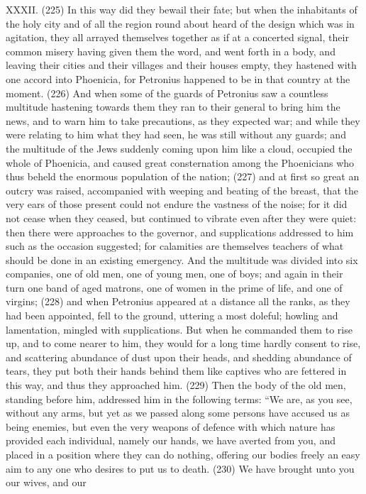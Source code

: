 XXXII. (225) In this way did they bewail their fate; but when the inhabitants of the holy city and of all
the region round about heard of the design which was in agitation, they all arrayed themselves
together as if at a concerted signal, their common misery having given them the word, and went
forth in a body, and leaving their cities and their villages and their houses empty, they hastened
with one accord into Phoenicia, for Petronius happened to be in that country at the moment. (226)
And when some of the guards of Petronius saw a countless multitude hastening towards them they
ran to their general to bring him the news, and to warn him to take precautions, as they expected
war; and while they were relating to him what they had seen, he was still without any guards; and
the multitude of the Jews suddenly coming upon him like a cloud, occupied the whole of Phoenicia,
and caused great consternation among the Phoenicians who thus beheld the enormous population
of the nation; (227) and at first so great an outcry was raised, accompanied with weeping and
beating of the breast, that the very ears of those present could not endure the vastness of the
noise; for it did not cease when they ceased, but continued to vibrate even after they were quiet:
then there were approaches to the governor, and supplications addressed to him such as the
occasion suggested; for calamities are themselves teachers of what should be done in an existing
emergency. And the multitude was divided into six companies, one of old men, one of young men,
one of boys; and again in their turn one band of aged matrons, one of women in the prime of life,
and one of virgins; (228) and when Petronius appeared at a distance all the ranks, as they had
been appointed, fell to the ground, uttering a most doleful; howling and lamentation, mingled with
supplications. But when he commanded them to rise up, and to come nearer to him, they would for
a long time hardly consent to rise, and scattering abundance of dust upon their heads, and
shedding abundance of tears, they put both their hands behind them like captives who are fettered
in this way, and thus they approached him. (229) Then the body of the old men, standing before
him, addressed him in the following terms: ``We are, as you see, without any arms, but yet as we
passed along some persons have accused us as being enemies, but even the very weapons of
defence with which nature has provided each individual, namely our hands, we have averted from
you, and placed in a position where they can do nothing, offering our bodies freely an easy aim to
any one who desires to put us to death. (230) We have brought unto you our wives, and our
